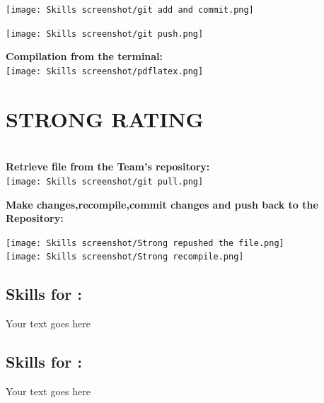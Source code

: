 \documentclass[a4paper, 11pt]{report}
\begin{document}
{\texttt{[image: Skills screenshot/git add and commit.png]}
\label{fig: git add and commit}

\texttt{[image: Skills screenshot/git push.png]}
\label{fig: git add and commit}

\textbf{Compilation from the terminal:}\\

\texttt{[image: Skills screenshot/pdflatex.png]}
\label{fig: pdflatex compilation}

\section{STRONG RATING}\\

\textbf{Retrieve file from the Team's repository:}\\

\texttt{[image: Skills screenshot/git pull.png]}

\textbf{Make changes,recompile,commit changes and push back to the Repository:}

\texttt{[image: Skills screenshot/Strong repushed the file.png]}\\

\texttt{[image: Skills screenshot/Strong recompile.png]}


\subsection{Skills for \majC: \studC}
Your text goes here
\subsection{Skills for \majD: \studD}
Your text goes here
\newpage
}
\end{document}

